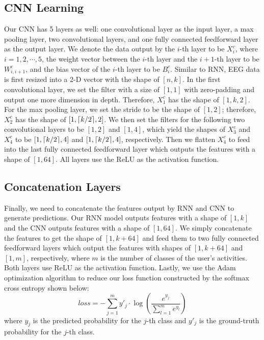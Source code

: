 \subsection{CNN Learning}
Our CNN has 5 layers as well: one convolutional layer as the input layer, a max pooling layer, two convolutional layers, and one fully connected feedforward layer as the output layer. We denote the data output by the $i$-th layer to be $X_i^{c}$, where $i=1,2,\cdots,5$, the weight vector between the $i$-th layer and the $i+1$-th layer to be $W_{i,i+1}^{c}$, and the bias vector of the $i$-th layer to be $B_{i}^{c}$. Similar to RNN, EEG data is first resized into a 2-D vector with the shape of $[n,k]$. In the first convolutional layer, we set the filter with a size of $[1, 1]$ with zero-padding and output one more dimension in depth. Therefore, $X_1^{c}$ has the shape of $[1, k, 2]$. For the max pooling layer, we set the stride to be the shape of $[1, 2]$; therefore, $X_{2}^{c}$ has the shape of $[1, \lceil k/2\rceil, 2]$. We then set the filters for the following two convolutional layers to be $[1, 2]$ and $[1, 4]$, which yield the shapes of $X_3^{c}$ and $X_4^{c}$ to be $[1, \lceil k/2\rceil, 4]$ and $[1, \lceil k/2\rceil, 4]$, respectively. Then we flatten $X_4^{c}$ to feed into the last fully connected feedforward layer which outputs the features with a shape of $[1, 64]$. All layers use the ReLU as the activation function.

\subsection{Concatenation Layers}
Finally, we need to concatenate the features output by RNN and CNN to generate predictions. Our RNN model outputs features with a shape of $[1, k]$ and the CNN outputs features with a shape of $[1, 64]$. We simply concatenate the features to get the shape of $[1, k + 64]$ and feed them to two fully connected feedforward layers which output the features with shapes of $[1, k+64]$ and $[1, m]$, respectively, where $m$ is the number of classes of the user's activities. Both layers use ReLU as the activation function. Lastly, we use the Adam optimization algorithm \cite{kingma2014adam} to reduce our loss function constructed by the softmax cross entropy shown below:
\begin{equation}
loss = - \sum_{j=1}^{m} y'_j \cdot \log(\frac{e^{y_j}}{\sum_{l=1}^m e^{y_l}})
\end{equation}
where $y_j$ is the predicted probability for the $j$-th class and $y'_j$ is the ground-truth probability for the $j$-th class.


